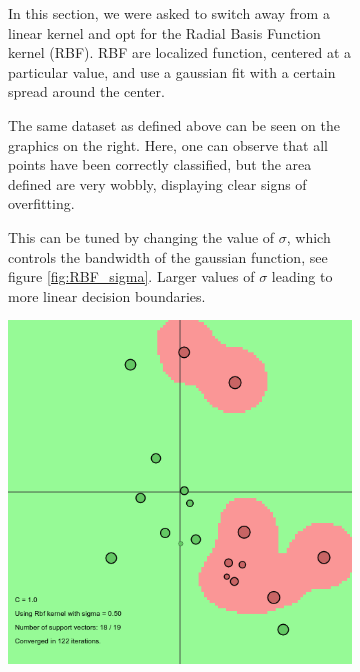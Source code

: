 \documentclass[11pt, a4paper]{article}
\begin{document}
\begin{figure}[H]
    \centering
    \begin{subfigure}[b]{.5\textwidth}
      In this section, we were asked to switch away from a linear kernel and
      opt for the Radial Basis Function kernel (RBF). RBF are localized
      function, centered at a particular value, and use a gaussian fit with
      a certain spread around the center. 

      The same dataset as defined above can be seen on the graphics on
      the right. Here, one can observe that all points have been
      correctly classified, but the area defined are very wobbly,
      displaying clear signs of overfitting.  

      This can be tuned by changing the value of $\sigma$, which
      controls the bandwidth of the gaussian function, see figure
      \ref{fig:RBF_sigma}. Larger values of $\sigma$ leading to more
      linear decision boundaries.
    \end{subfigure}%
    \begin{subfigure}{.5\textwidth}
      \vspace{-185pt}
      \centering
      \includegraphics[width=0.9\linewidth]{1-2-1-kernel.png}
    \end{subfigure}
\end{figure}
\end{document}
